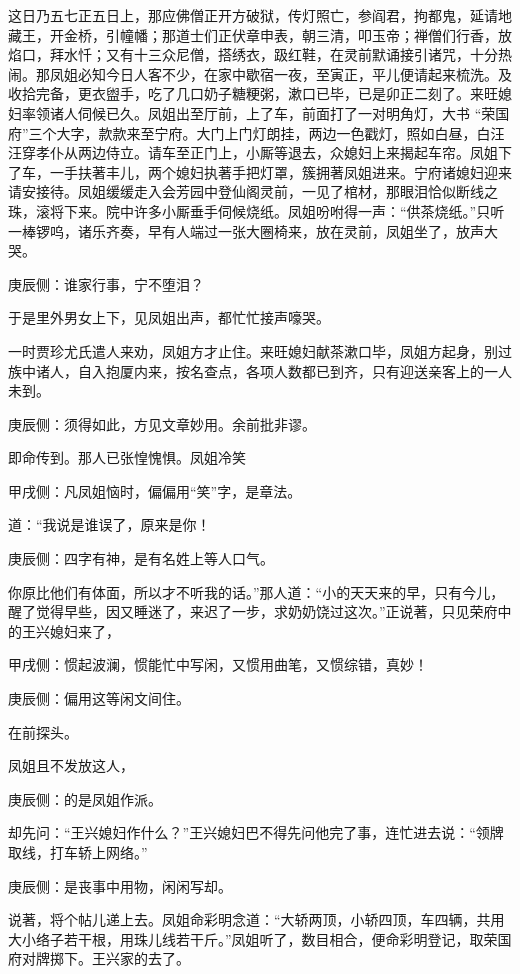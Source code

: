\begin{parag}
    这日乃五七正五日上，那应佛僧正开方破狱，传灯照亡，参阎君，拘都鬼，延请地藏王，开金桥，引幢幡；那道士们正伏章申表，朝三清，叩玉帝；禅僧们行香，放焰口，拜水忏；又有十三众尼僧，搭绣衣，趿红鞋，在灵前默诵接引诸咒，十分热闹。那凤姐必知今日人客不少，在家中歇宿一夜，至寅正，平儿便请起来梳洗。及收拾完备，更衣盥手，吃了几口奶子糖粳粥，漱口已毕，已是卯正二刻了。来旺媳妇率领诸人伺候已久。凤姐出至厅前，上了车，前面打了一对明角灯，大书 “荣国府”三个大字，款款来至宁府。大门上门灯朗挂，两边一色戳灯，照如白昼，白汪汪穿孝仆从两边侍立。请车至正门上，小厮等退去，众媳妇上来揭起车帘。凤姐下了车，一手扶著丰儿，两个媳妇执著手把灯罩，簇拥著凤姐进来。宁府诸媳妇迎来请安接待。凤姐缓缓走入会芳园中登仙阁灵前，一见了棺材，那眼泪恰似断线之珠，滚将下来。院中许多小厮垂手伺候烧纸。凤姐吩咐得一声：“供茶烧纸。”只听一棒锣呜，诸乐齐奏，早有人端过一张大圈椅来，放在灵前，凤姐坐了，放声大哭。\begin{note}庚辰侧：谁家行事，宁不堕泪？\end{note}于是里外男女上下，见凤姐出声，都忙忙接声嚎哭。
\end{parag}


\begin{parag}
    一时贾珍尤氏遣人来劝，凤姐方才止住。来旺媳妇献茶漱口毕，凤姐方起身，别过族中诸人，自入抱厦内来，按名查点，各项人数都已到齐，只有迎送亲客上的一人未到。\begin{note}庚辰侧：须得如此，方见文章妙用。余前批非谬。\end{note}即命传到。那人已张惶愧惧。凤姐冷笑\begin{note}甲戌侧：凡凤姐恼时，偏偏用“笑”字，是章法。\end{note}道：“我说是谁误了，原来是你！\begin{note}庚辰侧：四字有神，是有名姓上等人口气。\end{note}你原比他们有体面，所以才不听我的话。”那人道：“小的天天来的早，只有今儿，醒了觉得早些，因又睡迷了，来迟了一步，求奶奶饶过这次。”正说著，只见荣府中的王兴媳妇来了，\begin{note}甲戌侧：惯起波澜，惯能忙中写闲，又惯用曲笔，又惯综错，真妙！\end{note}\begin{note}庚辰侧：偏用这等闲文间住。\end{note}在前探头。
\end{parag}


\begin{parag}
    凤姐且不发放这人，\begin{note}庚辰侧：的是凤姐作派。\end{note}却先问：“王兴媳妇作什么？”王兴媳妇巴不得先问他完了事，连忙进去说：“领牌取线，打车轿上网络。”\begin{note}庚辰侧：是丧事中用物，闲闲写却。\end{note}说著，将个帖儿递上去。凤姐命彩明念道：“大轿两顶，小轿四顶，车四辆，共用大小络子若干根，用珠儿线若干斤。”凤姐听了，数目相合，便命彩明登记，取荣国府对牌掷下。王兴家的去了。
\end{parag}


